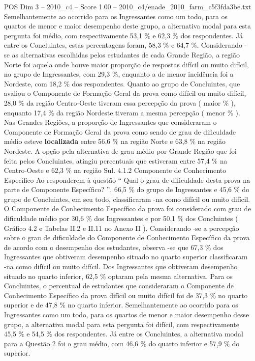 \begin{textsample}{POS Dim 3 – 2010\_c4 – Score 1.00 – 2010\_c4/enade\_2010\_farm\_c5f3fda3be.txt}
Semelhantemente ao ocorrido para os Ingressantes como um todo, para os quartos de menor e maior desempenho deste grupo, a alternativa modal para esta pergunta foi médio, com respectivamente 53,1 \% e 62,3 \% dos respondentes.
Já entre os Concluintes, estas percentagens foram, 58,3 \% e 64,7 \%.
Considerando -se as alternativas escolhidas pelos estudantes de cada Grande Região, a região Norte foi aquela onde houve maior proporção de respostas difícil ou muito difícil, no grupo de Ingressantes, com 29,3 \%, enquanto a de menor incidência foi a Nordeste, com 18,2 \% dos respondentes.
Quanto ao grupo de Concluintes, que avaliou o Componente de Formação Geral da prova como difícil ou muito difícil, 28,0 \% da região Centro-Oeste tiveram essa percepção da prova ( maior \% ), enquanto 17,4 \% da região Nordeste tiveram a mesma percepção ( menor \% ).
Nas Grandes Regiões, a proporção de Ingressantes que consideraram o Componente de Formação Geral da prova como sendo de grau de dificuldade médio esteve \textbf{localizada} entre 56,6 \% na região Norte e 63,8 \% na região Nordeste.
A opção pela alternativa de grau médio por Grande Região que foi feita pelos Concluintes, atingiu percentuais que estiveram entre 57,4 \% na Centro-Oeste e 62,3 \% na região Sul. 4.1.2 Componente de Conhecimento Específico Ao responderem à questão “ Qual o grau de dificuldade desta prova na parte de Componente Específico? ”, 66,5 \% do grupo de Ingressantes e 45,6 \% do grupo de Concluintes, em seu todo, classificaram -na como difícil ou muito difícil.
O Componente de Conhecimento Específico da prova foi considerado com grau de dificuldade médio por 30,6 \% dos Ingressantes e por 50,1 \% dos Concluintes ( Gráfico 4.2 e Tabelas II.2 e II.11 no Anexo II ).
Considerando -se a percepção sobre o grau de dificuldade do Componente de Conhecimento Específico da prova de acordo com o desempenho dos estudantes, observa -se que 67,3 \% dos Ingressantes que obtiveram desempenho situado no quarto superior classificaram -na como difícil ou muito difícil.
Dos Ingressantes que obtiveram desempenho situado no quarto inferior, 62,5 \% optaram pela mesma alternativa.
Para os Concluintes, o percentual de estudantes que consideraram o Componente de Conhecimento Específico da prova difícil ou muito difícil foi de 37,3 \% no quarto superior e de 47,8 \% no quarto inferior.
Semelhantemente ao ocorrido para os Ingressantes como um todo, para os quartos de menor e maior desempenho desse grupo, a alternativa modal para esta pergunta foi difícil, com respectivamente 45,5 \% e 54,5 \% dos respondentes.
Já entre os Concluintes, a alternativa modal para a Questão 2 foi o grau médio, com 46,6 \% do quarto inferior e 57,9 \% do superior.

\end{textsample}
